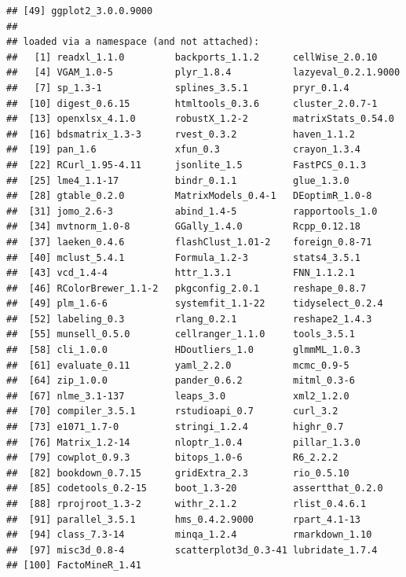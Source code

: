 \documentclass[]{book}
\begin{document}
\begin{verbatim}
## [49] ggplot2_3.0.0.9000   
## 
## loaded via a namespace (and not attached):
##   [1] readxl_1.1.0         backports_1.1.2      cellWise_2.0.10     
##   [4] VGAM_1.0-5           plyr_1.8.4           lazyeval_0.2.1.9000 
##   [7] sp_1.3-1             splines_3.5.1        pryr_0.1.4          
##  [10] digest_0.6.15        htmltools_0.3.6      cluster_2.0.7-1     
##  [13] openxlsx_4.1.0       robustX_1.2-2        matrixStats_0.54.0  
##  [16] bdsmatrix_1.3-3      rvest_0.3.2          haven_1.1.2         
##  [19] pan_1.6              xfun_0.3             crayon_1.3.4        
##  [22] RCurl_1.95-4.11      jsonlite_1.5         FastPCS_0.1.3       
##  [25] lme4_1.1-17          bindr_0.1.1          glue_1.3.0          
##  [28] gtable_0.2.0         MatrixModels_0.4-1   DEoptimR_1.0-8      
##  [31] jomo_2.6-3           abind_1.4-5          rapportools_1.0     
##  [34] mvtnorm_1.0-8        GGally_1.4.0         Rcpp_0.12.18        
##  [37] laeken_0.4.6         flashClust_1.01-2    foreign_0.8-71      
##  [40] mclust_5.4.1         Formula_1.2-3        stats4_3.5.1        
##  [43] vcd_1.4-4            httr_1.3.1           FNN_1.1.2.1         
##  [46] RColorBrewer_1.1-2   pkgconfig_2.0.1      reshape_0.8.7       
##  [49] plm_1.6-6            systemfit_1.1-22     tidyselect_0.2.4    
##  [52] labeling_0.3         rlang_0.2.1          reshape2_1.4.3      
##  [55] munsell_0.5.0        cellranger_1.1.0     tools_3.5.1         
##  [58] cli_1.0.0            HDoutliers_1.0       glmmML_1.0.3        
##  [61] evaluate_0.11        yaml_2.2.0           mcmc_0.9-5          
##  [64] zip_1.0.0            pander_0.6.2         mitml_0.3-6         
##  [67] nlme_3.1-137         leaps_3.0            xml2_1.2.0          
##  [70] compiler_3.5.1       rstudioapi_0.7       curl_3.2            
##  [73] e1071_1.7-0          stringi_1.2.4        highr_0.7           
##  [76] Matrix_1.2-14        nloptr_1.0.4         pillar_1.3.0        
##  [79] cowplot_0.9.3        bitops_1.0-6         R6_2.2.2            
##  [82] bookdown_0.7.15      gridExtra_2.3        rio_0.5.10          
##  [85] codetools_0.2-15     boot_1.3-20          assertthat_0.2.0    
##  [88] rprojroot_1.3-2      withr_2.1.2          rlist_0.4.6.1       
##  [91] parallel_3.5.1       hms_0.4.2.9000       rpart_4.1-13        
##  [94] class_7.3-14         minqa_1.2.4          rmarkdown_1.10      
##  [97] misc3d_0.8-4         scatterplot3d_0.3-41 lubridate_1.7.4     
## [100] FactoMineR_1.41
\end{verbatim}
\end{document}
